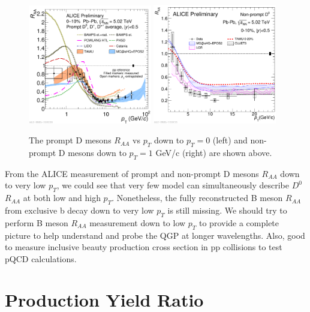 \begin{figure}[hbtp]
\begin{center}
\includegraphics[width=0.48\textwidth]{Figures/Chapter2/ALICEDRAALow.pdf}
\includegraphics[width=0.48\textwidth]{Figures/Chapter2/ALICENPDRAALow.pdf}
\caption{The prompt D mesons $R_{AA}$ vs $p_T$ down to $p_T = 0$ (left) and non-prompt D mesons down to $p_T = 1$ GeV/c (right) are shown above.}
\label{ALICEDRAALow}
\end{center}
\end{figure}   

From the ALICE measurement of prompt and non-prompt D mesons $R_{AA}$ down to very low $p_T$, we could see that very few model can simultaneously describe $D^0$ $R_{AA}$ at both low and high $p_T$. Nonetheless, the fully reconstructed B meson $R_{AA}$ from exclusive b decay down to very low $p_T$ is still missing. We should try to perform B meson $R_{AA}$ measurement down to low $p_T$ to provide a complete picture to help understand and probe the QGP at longer wavelengths. Also, good to measure inclusive beauty production cross section in pp collisions to test pQCD calculations.  



\section{Production Yield Ratio}

